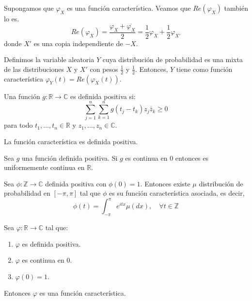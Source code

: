 \begin{exercise}
    Supongamos que $\varphi_X$ es una función característica.
    Veamos que $Re(\varphi_X)$ también lo es.
    $$Re(\varphi_X) = \frac{\varphi_X + \overline{\varphi_X}}{2} = \frac{1}{2}\varphi_X + \frac{1}{2}\varphi_{X'}$$
    donde $X'$ es una copia independiente de $-X$.

    Definimos la variable aleatoria $Y$ cuya distribución de probabilidad es una mixta de las distribuciones $X$ y $X'$ con pesos $\frac{1}{2}$ y $\frac{1}{2}$.
    Entonces, $Y$ tiene como función característica $\varphi_Y(t) = Re(\varphi_X(t))$.
\end{exercise}

\begin{definition}
    Una función $g: \mathbb{R} \to \mathbb{C}$ es definida positiva si:
    $$\sum_{j=1}^n \sum_{k=1}^n g(t_j-t_k)z_j\bar{z}_k \geq 0$$
    para todo $t_1, \dots, t_n \in \mathbb{R}$ y $z_1, \dots, z_n \in \mathbb{C}$.
\end{definition}

\begin{remark}
    La función característica es definida positiva.
\end{remark}

\begin{theorem}
    Sea $g$ una función definida positiva.
    Si $g$ es continua en 0 entonces es uniformemente continua en $\mathbb{R}$.
\end{theorem}

\begin{lemma}[Herglotz]
    Sea $\phi: \mathbb{Z} \to \mathbb{C}$ definida positiva con $\phi(0) = 1$.
    Entonces existe $\mu$ distribución de probabilidad en $[-\pi, \pi]$ tal que $\phi$ es su función característica asociada, es decir,
    $$\phi(t) = \int_{-\pi}^\pi e^{itx}\mu(dx), \quad \forall t \in \mathbb{Z}$$
\end{lemma}

\begin{theorem}[Bochner]
    Sea $\varphi: \mathbb{R} \to \mathbb{C}$ tal que:
    \begin{enumerate}
        \item $\varphi$ es definida positiva.
        \item $\varphi$ es continua en 0.
        \item $\varphi(0) = 1$.
    \end{enumerate}
    Entonces $\varphi$ es una función característica.
\end{theorem}

